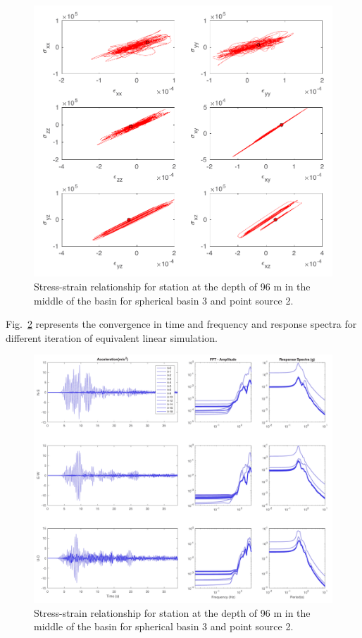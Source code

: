  \begin{figure}[H]
    \centering
    \includegraphics[width=\textwidth]{figures/pdf/stress_strain_b3_p2_st2560_2560_96.pdf}
    \caption{Stress-strain relationship for station at the depth of 96 m in the middle of the basin for spherical basin 3 and point source 2.}
    \label{fig:stress_strain_b3_p2_st2560_2560_96}
\end{figure}


Fig.~\ref{fig:iteration_test_value_convergence} represents the convergence in time and frequency and response spectra for different iteration of equivalent linear simulation.  

 \begin{figure}[H]
    \centering
    \includegraphics[width=\textwidth]{figures/pdf/iteration_test_value_convergence.pdf}
    \caption{Stress-strain relationship for station at the depth of 96 m in the middle of the basin for spherical basin 3 and point source 2.}
    \label{fig:iteration_test_value_convergence}
\end{figure}

